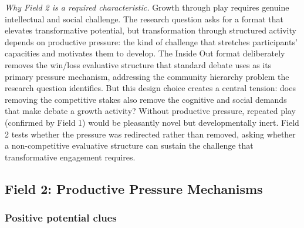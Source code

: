 \noindent\textit{Why Field 2 is a required characteristic.} Growth through play requires genuine intellectual and social challenge. The research question asks for a format that elevates transformative potential, but transformation through structured activity depends on productive pressure: the kind of challenge that stretches participants' capacities and motivates them to develop. The Inside Out format deliberately removes the win/loss evaluative structure that standard debate uses as its primary pressure mechanism, addressing the community hierarchy problem the research question identifies. But this design choice creates a central tension: does removing the competitive stakes also remove the cognitive and social demands that make debate a growth activity? Without productive pressure, repeated play (confirmed by Field 1) would be pleasantly novel but developmentally inert. Field 2 tests whether the pressure was redirected rather than removed, asking whether a non-competitive evaluative structure can sustain the challenge that transformative engagement requires.

\bigskip

\subsection*{Field 2: Productive Pressure Mechanisms}

\subsubsection*{Positive potential clues}

